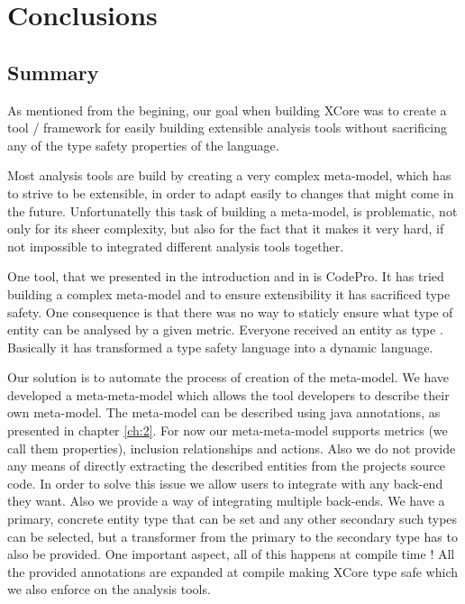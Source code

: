 \chapter{Conclusions}\label{conclusions}

\section{Summary}

        As mentioned from the begining, our goal when building XCore was to create a tool / framework
for easily building extensible analysis tools without sacrificing any of the type safety properties
of the language. 

        Most analysis tools are build by creating a very complex meta-model, which has to strive to be
extensible, in order to adapt easily to changes that might come in the future. Unfortunatelly this task
of building a meta-model, is problematic, not only for its sheer complexity, but also for the fact that 
it makes it very hard, if not impossible to integrated different analysis tools together. 

        One tool, that we presented in the introduction and in \cite{oldThesis} is CodePro. It has tried
building a complex meta-model and to ensure extensibility it has sacrificed type safety. One consequence is
that there was no way to staticly ensure what type of entity can be analysed by a given metric. Everyone received an entity
as type . Basically it has transformed a type safety language into a dynamic language. 

        Our solution is to automate the process of creation of the meta-model. We have developed a meta-meta-model
which allows the tool developers to describe their own meta-model. The meta-model can be described using java annotations, as presented in
chapter \ref{ch:2}. For now our meta-meta-model supports  metrics (we call them properties), inclusion relationships and actions.
Also we do not provide any means of directly extracting the described entities from the projects source code. In order to solve this issue
we allow users to integrate with any back-end they want.  Also we provide a way of integrating multiple back-ends. We have a primary, concrete
entity type that can be set and any other secondary such types can be selected, but a transformer from the primary to the secondary type has
to also be provided. One important aspect, all of this happens at compile time ! All the provided annotations are expanded at compile making
XCore type safe which we also enforce on the analysis tools. 

